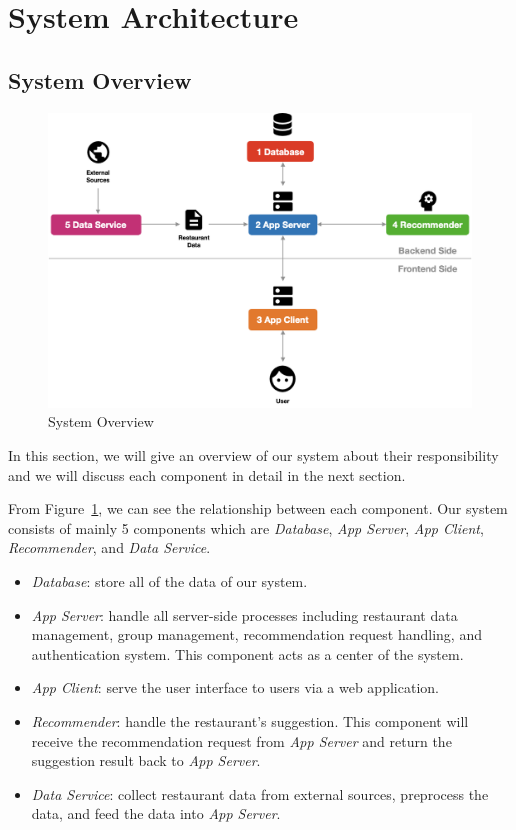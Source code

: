 \documentclass[12pt,oneside,openright,a4paper]{cpe-english-project}
\begin{document}
\section{System Architecture}
\subsection{System Overview}
\begin{figure}[H]\centering
\includegraphics[width=360pt]{./images/3system_overview.png}
\caption{System Overview}\label{fig:3system_overview}
\end{figure}\vspace{-24pt}

In this section, we will give an overview of our system about their responsibility and we will discuss each component in detail in the next section.

From Figure~\ref{fig:3system_overview}, we can see the relationship between each component. Our system consists of mainly 5 components which are \textit{Database}, \textit{App Server}, \textit{App Client}, \textit{Recommender}, and \textit{Data Service}.

\begin{itemize}
\item \textit{Database}: store all of the data of our system.
\item \textit{App Server}: handle all server-side processes including restaurant data management, group management, recommendation request handling, and authentication system. This component acts as a center of the system.
\item \textit{App Client}: serve the user interface to users via a web application.
\item \textit{Recommender}: handle the restaurant's suggestion. This component will receive the recommendation request from \textit{App Server} and return the suggestion result back to \textit{App Server}.
\item \textit{Data Service}: collect restaurant data from external sources, preprocess the data, and feed the data into \textit{App Server}.
\end{itemize}
\end{document}
